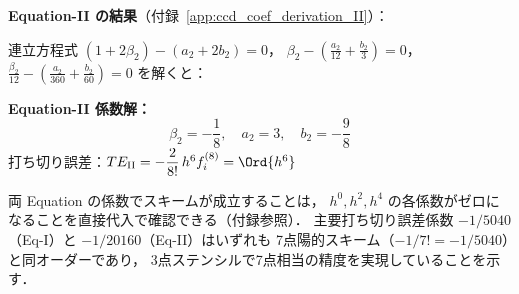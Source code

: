 \textbf{Equation-II の結果}（付録~\ref{app:ccd_coef_derivation_II}）：

連立方程式
$(1+2\beta_2)-(a_2+2b_2)=0$，
$\beta_2 - (\tfrac{a_2}{12}+\tfrac{b_2}{3})=0$，
$\tfrac{\beta_2}{12} - (\tfrac{a_2}{360}+\tfrac{b_2}{60})=0$
を解くと：

\begin{tcolorbox}[resultbox]
\textbf{Equation-II 係数解：}
\begin{equation}
  \boxed{
    \beta_2 = -\frac{1}{8},\quad
    a_2 = 3,\quad
    b_2 = -\frac{9}{8}
  }
  \label{eq:coef_CCD}
\end{equation}
打ち切り誤差：$TE_{\mathrm{II}} = -\dfrac{2}{8!}\,h^6 f^{(8)}_i = \Ord{h^6}$
\label{eq:CCD_TE_II}
\end{tcolorbox}

両 Equation の係数でスキームが成立することは，
$h^0, h^2, h^4$ の各係数がゼロになることを直接代入で確認できる（付録参照）．
主要打ち切り誤差係数 $-1/5040$（Eq-I）と $-1/20160$（Eq-II）はいずれも
7点陽的スキーム（$-1/7! = -1/5040$）と同オーダーであり，
3点ステンシルで7点相当の精度を実現していることを示す．

